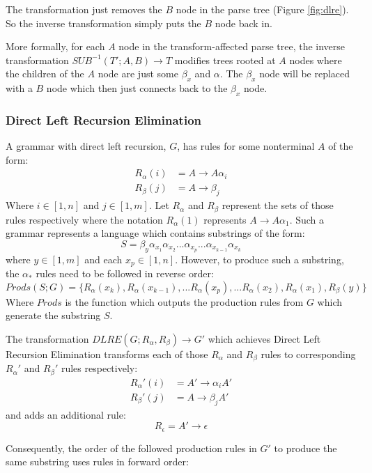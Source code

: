 \documentclass[11pt]{article}
\begin{document}
{The transformation just removes the $B$ node in the parse tree (Figure \ref{fig:dlre}).
So the inverse transformation simply puts the $B$ node back in.

More formally, for each $A$ node in the transform-affected parse tree, the inverse transformation $SUB^{-1}(T'; A, B) \rightarrow T$
modifies trees rooted at $A$ nodes where the children of the $A$ node are just some $\beta_x$ and $\alpha$.
The $\beta_x$ node will be replaced with a $B$ node which then just connects back to the $\beta_x$ node.

\subsubsection{Direct Left Recursion Elimination}
A grammar with direct left recursion, $G$, has rules for some nonterminal $A$ of the form:
\begin{align*}
R_\alpha(i) &= A \rightarrow A \alpha_i \\
R_\beta(j) &= A \rightarrow \beta_j
\end{align*}
Where $i \in [1,n]$ and $j \in [1,m]$.
Let $R_\alpha$ and $R_\beta$ represent the sets of those rules respectively where the notation
$R_\alpha(1)$ represents $A \rightarrow A \alpha_1$. 
Such a grammar represents a language which contains substrings of the form:
\[ S = \beta_y \alpha_{x_1} \alpha_{x_2} ... \alpha_{x_p}...\alpha_{x_{k-1}} \alpha_{x_k}\] 
where $y \in [1,m]$ and each $x_p \in [1,n]$.
However, to produce such a substring, the $\alpha_*$ rules need to be followed in reverse order:
\[Prods(S;G) = \{R_\alpha(x_k), R_\alpha(x_{k-1}), ... R_\alpha(x_{p}), ... R_\alpha(x_2), R_\alpha(x_1), R_\beta(y)\}\]
Where $Prods$ is the function which outputs the production rules from $G$ which generate the substring $S$.

The transformation \cite{aho} $DLRE(G; R_\alpha, R_\beta) \rightarrow G'$ which achieves Direct
Left Recursion Elimination transforms each of those $R_\alpha$ and $R_\beta$ rules to corresponding 
$R_\alpha'$ and $R_\beta'$ rules respectively:
\begin{align*}
R_\alpha'(i) &= A' \rightarrow \alpha_i A'\\
R_\beta'(j) &= A \rightarrow \beta_j A'
\end{align*}
and adds an additional rule:
\[ R_\epsilon = A' \rightarrow \epsilon\]

Consequently, the order of the followed production rules in $G'$ to produce the same substring uses rules in forward order:

}
\end{document}
